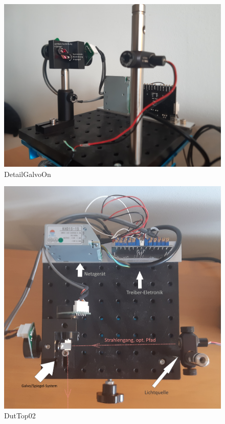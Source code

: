 \begin{figure}[h!]	\centering	\includegraphics[width=\textwidth]{images/DetailGalvoOn.jpg}	\caption{DetailGalvoOn}	\label{DetailGalvoOn}	\end{figure}
\begin{figure}[h!]	\centering	\includegraphics[width=\textwidth]{images/DutTop02.jpg}	\caption{DutTop02}	\label{DutTop02}	\end{figure}

